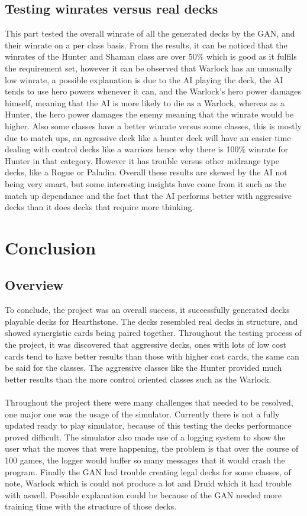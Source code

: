 \documentclass{report} %
\begin{document}
\subsection{Testing winrates versus real decks}
This part tested the overall winrate of all the generated decks by the GAN, and their winrate on a per class basis. From the results, it can be noticed that the winrates of the Hunter and Shaman class are over 50\% which is good as it fulfils the requirement set, however it can be observed that Warlock has an unusually low winrate, a possible explanation is due to the AI playing the deck, the AI tends to use hero powers whenever it can, and the Warlock's hero power damages himself, meaning that the AI is more likely to die as a Warlock, whereas as a Hunter, the hero power damages the enemy meaning that the winrate would be higher. Also some classes have a better winrate versus some classes, this is mostly due to match ups, an agressive deck like a hunter deck will have an easier time dealing with control decks like a warriors hence why there is 100\% winrate for Hunter in that category. However it has trouble versus other midrange type decks, like a Rogue or Paladin. Overall these results are skewed by the AI not being very smart, but some interesting insights have come from it such as the match up dependance and the fact that the AI performs better with aggressive decks than it does decks that require more thinking. 


\section{Conclusion}
\subsection{Overview}
To conclude, the project was an overall success, it successfully generated decks playable decks for Hearthstone. The decks resembled real decks in structure, and showed synergistic cards being paired together. Throughout the testing process of the project, it was discovered that aggressive decks, ones with lots of low cost cards tend to have better results than those with higher cost cards, the same can be said for the classes. The aggressive classes like the Hunter provided much better results than the more control oriented classes such as the Warlock. \\
\\ 
Throughout the project there were many challenges that needed to be resolved, one major one was the usage of the simulator. Currently there is not a fully updated ready to play simulator, because of this testing the decks performance proved difficult. The simulator also made use of a logging system to show the user what the moves that were happening, the problem is that over the course of 100 games, the logger would buffer so many messages that it would crash the program. Finally the GAN had trouble creating legal decks for some classes, of note, Warlock which is could not produce a lot and Druid which it had trouble with aswell. Possible explanation could be because of the GAN needed more training time with the structure of those decks. 
\end{document}
